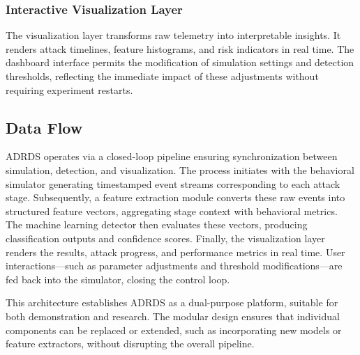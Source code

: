 \subsubsection{Interactive Visualization Layer}
The visualization layer transforms raw telemetry into interpretable insights. It renders attack timelines, feature histograms, and risk indicators in real time. The dashboard interface permits the modification of simulation settings and detection thresholds, reflecting the immediate impact of these adjustments without requiring experiment restarts.

\subsection{Data Flow}

ADRDS operates via a closed-loop pipeline ensuring synchronization between simulation, detection, and visualization. The process initiates with the behavioral simulator generating timestamped event streams corresponding to each attack stage. Subsequently, a feature extraction module converts these raw events into structured feature vectors, aggregating stage context with behavioral metrics. The machine learning detector then evaluates these vectors, producing classification outputs and confidence scores. Finally, the visualization layer renders the results, attack progress, and performance metrics in real time. User interactions—such as parameter adjustments and threshold modifications—are fed back into the simulator, closing the control loop.

This architecture establishes ADRDS as a dual-purpose platform, suitable for both demonstration and research. The modular design ensures that individual components can be replaced or extended, such as incorporating new models or feature extractors, without disrupting the overall pipeline.

